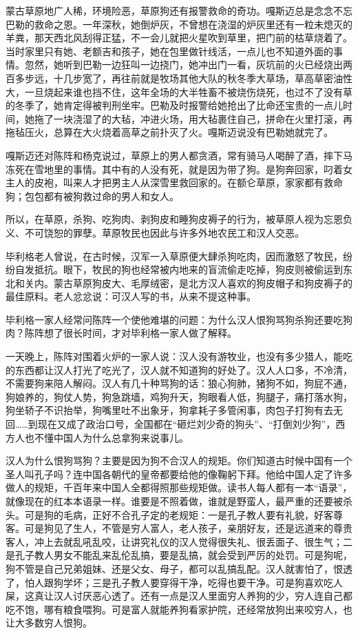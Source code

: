 \par 蒙古草原地广人稀，环境险恶，草原狗还有报警救命的奇功。嘎斯迈总是念念不忘巴勒的救命之恩。一年深秋，她倒炉灰，不曾想在浇湿的炉灰里还有一粒未熄灭的羊粪，那天西北风刮得正猛，不一会儿就把火星吹到草里，把门前的枯草烧着了。当时家里只有她、老额吉和孩子，她在包里做针线活，一点儿也不知道外面的事情。忽然，她听到巴勒一边狂叫一边挠门，她冲出门一看，灰坑前的火已经烧出两百多步远，十几步宽了，再往前就是牧场其他大队的秋冬季大草场，草高草密油性大，一旦烧起来谁也挡不住，这年全场的大半牲畜不被烧伤烧死，也过不了没有草的冬季了，她肯定得被判刑坐牢。巴勒及时报警给她抢出了比命还宝贵的一点儿时间，她拖了一块浇湿了的大毡，冲进火场，用大毡裹住自己，拼命在火里打滚，再拖毡压火，总算在大火烧着高草之前扑灭了火。嘎斯迈说没有巴勒她就完了。
\par 嘎斯迈还对陈阵和杨克说过，草原上的男人都贪酒，常有骑马人喝醉了酒，摔下马冻死在雪地里的事情。其中有的人没有死，就是因为带了狗。是狗奔回家，叼着女主人的皮袍，叫来人才把男主人从深雪里救回家的。在额仑草原，家家都有救命狗；包包都有被狗救过命的男人和女人。
\par 所以，在草原，杀狗、吃狗肉、剥狗皮和睡狗皮褥子的行为，被草原人视为忘恩负义、不可饶恕的罪孽。草原牧民也因此与许多外地农民工和汉人交恶。
\par 毕利格老人曾说，在古时候，汉军一入草原便大肆杀狗吃肉，因而激怒了牧民，纷纷自发抵抗。眼下，牧民的狗也经常被内地来的盲流偷走吃掉，狗皮则被偷运到东北和关内。蒙古草原狗皮大、毛厚绒密，是北方汉人喜欢的狗皮帽子和狗皮褥子的最佳原料。老人忿忿说：可汉人写的书，从来不提这种事。
\par 毕利格一家人经常问陈阵一个使他难堪的问题：为什么汉人恨狗骂狗杀狗还要吃狗肉？陈阵想了很长时间，才对毕利格一家人做了解释。
\par 一天晚上，陈阵对围着火炉的一家人说：汉人没有游牧业，也没有多少猎人，能吃的东西都让汉人打光了吃光了，汉人就不知道狗的好处了。汉人人口多，不冷清，不需要狗来陪人解闷。汉人有几十种骂狗的话：狼心狗肺，猪狗不如，狗屁不通，狗娘养的，狗仗人势，狗急跳墙，鸡狗升天，狗眼看人低，狗腿子，痛打落水狗，狗坐轿子不识抬举，狗嘴里吐不出象牙，狗拿耗子多管闲事，肉包子打狗有去无回……到现在又成了政治口号，全国都在“砸烂刘少奇的狗头”、“打倒刘少狗”，西方人也不懂中国人为什么总拿狗来说事儿。
\par 汉人为什么恨狗骂狗？主要是因为狗不合汉人的规矩。你们知道古时候中国有一个圣人叫孔子吗？连中国各朝代的皇帝都要给他的像鞠躬下拜。他给中国人定了许多做人的规矩，千百年来中国人全都得照那些规矩做。读书人每人都有一本“语录”，就像现在的红本本语录一样。谁要是不照着做，谁就是野蛮人，最严重的还要被杀头。可是狗的毛病，正好不合孔子定的老规矩：一是孔子教人要有礼貌，好客尊客。可是狗见了生人，不管是穷人富人，老人孩子，亲朋好友，还是远道来的尊贵客人，冲上去就乱吼乱咬，让讲究礼仪的汉人觉得很失礼、很丢面子、很生气；二是孔子教人男女不能乱来乱伦乱搞，要是乱搞，就会受到严厉的处罚。可是狗呢，狗不管是自己兄弟姐妹、还是父女、母子，都可以乱搞乱配。汉人就害怕了，恨透了，怕人跟狗学坏；三是孔子教人要穿得干净，吃得也要干净。可是狗喜欢吃人屎，这真让汉人讨厌恶心透了。还有一点是汉人里面穷人养狗的少，穷人连自己都吃不饱，哪有粮食喂狗。可是富人就能养狗看家护院，还经常放狗出来咬穷人，也让大多数穷人恨狗。
